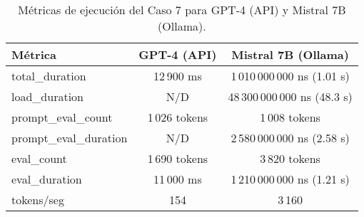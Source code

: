 
\begin{table}[h!]
\centering
\begin{tabular}{|l|c|c|}
\hline
\textbf{Métrica} & \textbf{GPT-4 (API)} & \textbf{Mistral 7B (Ollama)} \\
\hline
total\_duration & 12\,900 ms & 1\,010\,000\,000 ns (1.01 s) \\
load\_duration & N/D & 48\,300\,000\,000 ns (48.3 s) \\
prompt\_eval\_count & 1\,026 tokens & 1\,008 tokens \\
prompt\_eval\_duration & N/D & 2\,580\,000\,000 ns (2.58 s) \\
eval\_count & 1\,690 tokens & 3\,820 tokens \\
eval\_duration & 11\,000 ms & 1\,210\,000\,000 ns (1.21 s) \\
tokens/seg & 154 & 3\,160 \\
\hline
\end{tabular}
\caption{Métricas de ejecución del Caso 7 para GPT-4 (API) y Mistral 7B (Ollama).}
\end{table}
